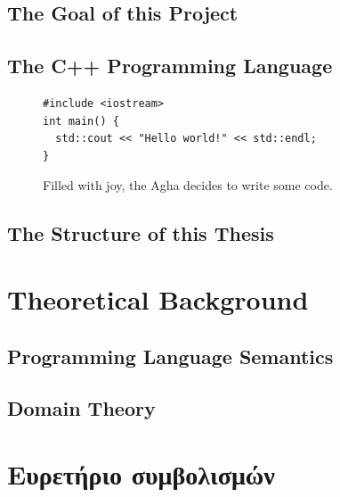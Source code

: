 \documentclass[diploma]{softlab-thesis}
\begin{document}
\section{The Goal of this Project}

\section{The C++ Programming Language}


\begin{figure}[t]
\setlength\partopsep{-\topsep}%
\begin{verbatim}
#include <iostream>
int main() {
  std::cout << "Hello world!" << std::endl;
}
\end{verbatim}
\caption{Filled with joy, the Agha decides to write some code.%
  \label{fig:hello-english}}
\end{figure}


\section{The Structure of this Thesis}

\chapter{Theoretical Background}

\section{Programming Language Semantics}

\section{Domain Theory}




\nocite{*}






\backmatter

\appendix

\chapter{Ευρετήριο συμβολισμών}
\end{document}
